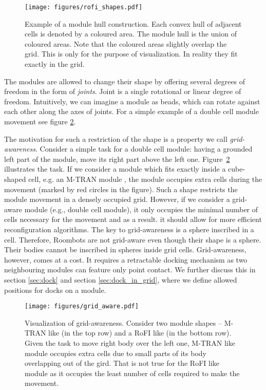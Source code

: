 \begin{figure}[!ht]
    \centering
    \texttt{[image: figures/rofi\_shapes.pdf]}
    \caption{Example of a module hull construction. Each convex hull of adjacent
    cells is denoted by a coloured area. The module hull is the union of coloured
    areas. Note that the coloured areas slightly overlap the grid. This is only
    for the purpose of visualization. In reality they fit exactly in the grid.}
    \label{fig:rofi_shapes}
\end{figure}

The modules are allowed to change their shape by offering several degrees of
freedom in the form of \emph{joints}. Joint is a single rotational or linear
degree of freedom. Intuitively, we can imagine a module as beads, which can rotate
against each other along the axes of joints. For a simple example of a double
cell module movement see figure \ref{fig:grid_aware}.

The motivation for such a restriction of the shape is a property we call
\emph{grid-awareness}. Consider a simple task for a double cell module: having a
grounded left part of the module, move its right part above the left one.
Figure~\ref{fig:grid_aware} illustrates the task. If we consider a module which
fits exactly inside a cube-shaped cell, e.g. an M-TRAN module
\cite{haruhisa_kurokawa_m-tran_2003}, the module occupies extra cells during the
movement (marked by red circles in the figure). Such a shape restricts the
module movement in a densely occupied grid. However, if we consider a grid-aware
module (e.g., double cell module), it only occupies the minimal number of cells
necessary for the movement and as a result. it should allow for more efficient
reconfiguration algorithms. The key to grid-awareness is a sphere inscribed in
a cell. Therefore, Roombots \cite{bonardi_locomotion_2012} are not grid-aware
even though their shape is a sphere. Their bodies cannot be inscribed in spheres
inside grid cells. Grid-awareness, however, comes at a cost. It requires a
retractable docking mechanism as two neighbouring modules can feature only point
contact. We further discuss this in section \ref{sec:dock} and section
\ref{sec:dock_in_grid}, where we define allowed positions for docks on a module.

\begin{figure}[!t]
    \centering
    \texttt{[image: figures/grid\_aware.pdf]}
    \caption{Visualization of grid-awareness. Consider two module shapes --
    M-TRAN \cite{haruhisa_kurokawa_m-tran_2003} like (in the top row) and a RoFI
    like (in the bottom row). Given the task to move right body over the left
    one, M-TRAN like module occupies extra cells due to small parts of its body
    overlapping out of the gird. That is not true for the RoFI like module as it
    occupies the least number of cells required to make the movement. }
    \label{fig:grid_aware}
\end{figure}

